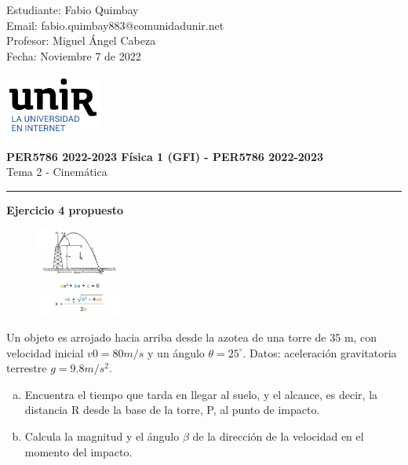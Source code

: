 \documentclass[11pt,letterpaper]{article}
\begin{document}
\pagestyle{plain}

\begin{flushleft}
Estudiante: Fabio Quimbay\\
Email: fabio.quimbay883@comunidadunir.net\\
Profesor: Miguel Ángel Cabeza\\
Fecha: Noviembre 7 de 2022\\
\end{flushleft}

\begin{flushright}\vspace{-20mm}
\includegraphics[height=2cm]{logo.png}
\end{flushright}
 
\begin{center}\vspace{0cm}
\textbf{\large PER5786 2022-2023  Física 1 (GFI) - PER5786 2022-2023}\\
 Tema 2 - Cinemática
\end{center}

 
\rule{\linewidth}{0.1mm}

\bigskip
\bigskip

\textbf{Ejercicio 4 propuesto}\\

\begin{figure}
    \centering
    \includegraphics[width=0.25\textwidth]{ejemplo_4.png}
\end{figure}

Un objeto es arrojado hacia arriba desde la azotea de una torre de 35 m, con velocidad inicial $v0 = 80 m/s$ y un ángulo $\theta = 25^\circ$. Datos: aceleración gravitatoria terrestre $g = 9.8 m/s^2$.

\begin{enumerate}[(a)] 
\item {Encuentra el tiempo que tarda en llegar al suelo, y el alcance, es decir, la distancia R desde la base de la torre, P, al punto de impacto.}
\item {Calcula la magnitud y el ángulo $\beta$ de la dirección de la velocidad en el momento del impacto.}
\end{enumerate}
\end{document}
